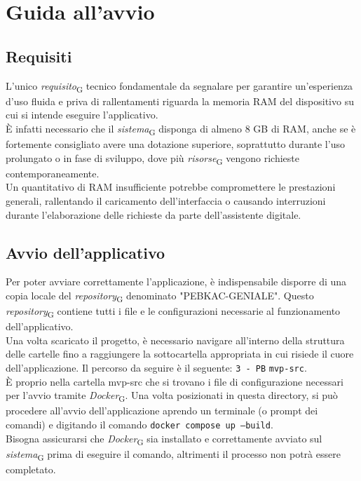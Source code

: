 \section{Guida all'avvio}
\subsection{Requisiti}
L’unico \textit{requisito}\textsubscript{G} tecnico fondamentale da segnalare per garantire un’esperienza d’uso fluida e priva di rallentamenti riguarda la memoria RAM del dispositivo su cui si intende eseguire l’applicativo. \\
È infatti necessario che il \textit{sistema}\textsubscript{G} disponga di almeno 8 GB di RAM, anche se è fortemente consigliato avere una dotazione superiore, soprattutto durante l’uso prolungato o in fase di sviluppo, dove più \textit{risorse}\textsubscript{G} vengono richieste contemporaneamente. \\
Un quantitativo di RAM insufficiente potrebbe compromettere le prestazioni generali, rallentando il caricamento dell'interfaccia o causando interruzioni durante l'elaborazione delle richieste da parte dell’assistente digitale.

\subsection{Avvio dell'applicativo}
Per poter avviare correttamente l’applicazione, è indispensabile disporre di una copia locale del \textit{repository}\textsubscript{G} denominato "PEBKAC-GENIALE". Questo \textit{repository}\textsubscript{G} contiene tutti i file e le configurazioni necessarie al funzionamento dell’applicativo. \\
Una volta scaricato il progetto, è necessario navigare all'interno della struttura delle cartelle fino a raggiungere la sottocartella appropriata in cui risiede il cuore dell'applicazione. Il percorso da seguire è il seguente:
\texttt{3 - PB} \> \texttt{mvp-src}. \\
È proprio nella cartella mvp-src che si trovano i file di configurazione necessari per l'avvio tramite \textit{Docker}\textsubscript{G}. Una volta posizionati in questa directory, si può procedere all’avvio dell’applicazione aprendo un terminale (o prompt dei comandi) e digitando il comando \texttt{docker compose up --build}. \\
Bisogna assicurarsi che \textit{Docker}\textsubscript{G} sia installato e correttamente avviato sul \textit{sistema}\textsubscript{G} prima di eseguire il comando, altrimenti il processo non potrà essere completato.

